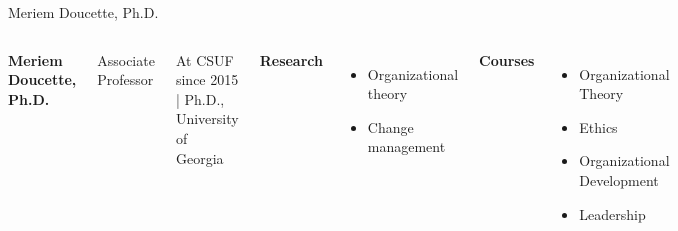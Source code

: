 \documentclass[10pt]{beamer}
\newlength{\imageheight}
\begin{document}
\begin{frame}{Meriem Doucette, Ph.D.}
\begin{columns}[T,onlytextwidth]
    \raggedright
    {\large\bfseries Meriem Doucette, Ph.D.}\par
    {Associate Professor}\par
    {\footnotesize At CSUF since 2015 \quad | \quad Ph.D., University of Georgia}\par\vspace{0.4em}

    \textbf{Research}
    \begin{itemize}
      \item Organizational theory
      \item Change management
    \end{itemize}

    \textbf{Courses}
    \begin{itemize}
      \item Organizational Theory
      \item Ethics
      \item Organizational Development
      \item Leadership
    \end{itemize}

    \vspace*{0.25cm}
    \includegraphics[height=\imageheight]{images/doucette.png}
\end{columns}
\end{frame}
\end{document}
